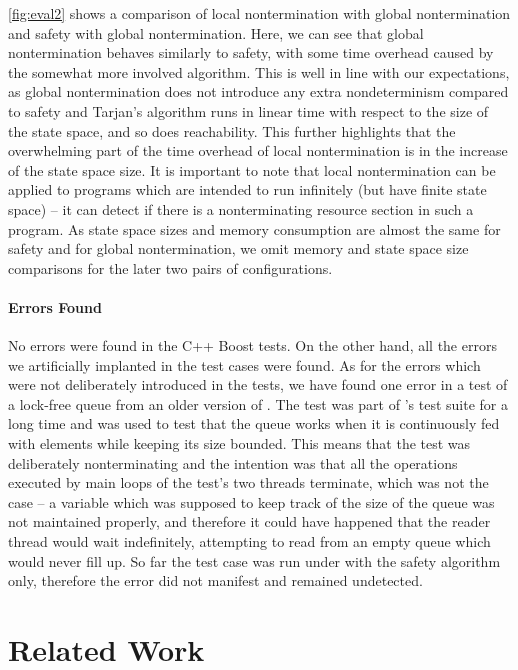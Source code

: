 \autoref{fig:eval2} shows a comparison of local nontermination with global nontermination and safety with global nontermination.
Here, we can see that global nontermination behaves similarly to safety, with some time overhead caused by the somewhat more involved algorithm.
This is well in line with our expectations, as global nontermination does not introduce any extra nondeterminism compared to safety and Tarjan's algorithm runs in linear time with respect to the size of the state space, and so does reachability.
This further highlights that the overwhelming part of the time overhead of local
nontermination is in the increase of the state space size.
It is important to note that local nontermination can be applied to programs
which are intended to run infinitely (but have finite state space) -- it can detect if there is a nonterminating resource section in such a program.
As state space sizes and memory consumption are almost the same for safety and for global nontermination, we omit memory and state space size comparisons for the later two pairs of configurations.

\paragraph{Errors Found}
%
No errors were found in the C++ Boost tests. On the other hand, all the errors
we artificially implanted in the test cases were found.  As for the errors which
were not deliberately introduced in the tests, we have found one error in a test
of a lock-free queue from an older version of \divine.  The test was part of
\divine's test suite for a long time and was used to test that the queue works
when it is continuously fed with elements while keeping its size bounded.  This
means that the test was deliberately nonterminating and the intention was that
all the operations executed by main loops of the test's two threads terminate,
which was not the case -- a variable which was supposed to keep track of the
size of the queue was not maintained properly, and therefore it could have happened
that the reader thread would wait indefinitely, attempting to read from an empty
queue which would never fill up. So far the test case was run under \divine with
the safety algorithm only, therefore the error did not manifest and remained
undetected.




\section{Related Work} \label{sec:related}

